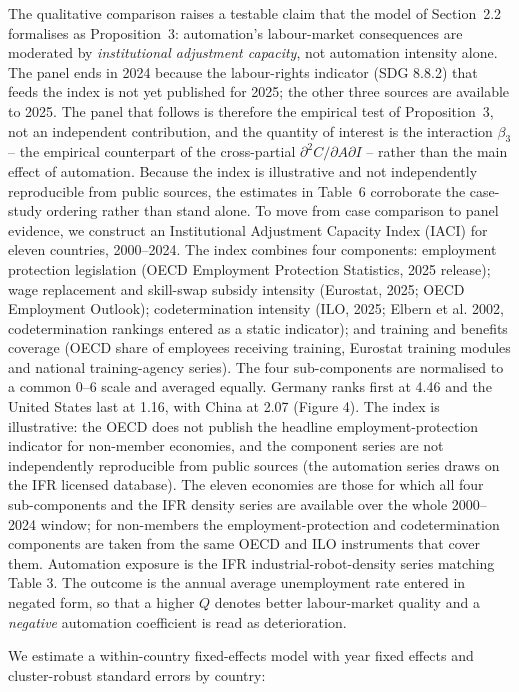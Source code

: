 \documentclass[12pt]{article}
\begin{document}
The qualitative comparison raises a testable claim that the model of Section~2.2 formalises as Proposition~3: automation's labour-market consequences are moderated by \emph{institutional adjustment capacity}, not automation intensity alone. The panel ends in 2024 because the labour-rights indicator (SDG 8.8.2) that feeds the index is not yet published for 2025; the other three sources are available to 2025. The panel that follows is therefore the empirical test of Proposition~3, not an independent contribution, and the quantity of interest is the interaction $\beta_3$ -- the empirical counterpart of the cross-partial $\partial^2 C/\partial A\partial I$ -- rather than the main effect of automation. Because the index is illustrative and not independently reproducible from public sources, the estimates in Table~6 corroborate the case-study ordering rather than stand alone. To move from case comparison to panel evidence, we construct an Institutional Adjustment Capacity Index (IACI) for eleven countries, 2000--2024. The index combines four components: employment protection legislation (OECD Employment Protection Statistics, 2025 release); wage replacement and skill-swap subsidy intensity (Eurostat, 2025; OECD Employment Outlook); codetermination intensity (ILO, 2025; Elbern et al. 2002, codetermination rankings entered as a static indicator); and training and benefits coverage (OECD share of employees receiving training, Eurostat training modules and national training-agency series). The four sub-components are normalised to a common 0--6 scale and averaged equally. Germany ranks first at 4.46 and the United States last at 1.16, with China at 2.07 (Figure 4). The index is illustrative: the OECD does not publish the headline employment-protection indicator for non-member economies, and the component series are not independently reproducible from public sources (the automation series draws on the IFR licensed database). The eleven economies are those for which all four sub-components and the IFR density series are available over the whole 2000--2024 window; for non-members the employment-protection and codetermination components are taken from the same OECD and ILO instruments that cover them. Automation exposure is the IFR industrial-robot-density series matching Table 3. The outcome is the annual average unemployment rate entered in negated form, so that a higher $Q$ denotes better labour-market quality and a \emph{negative} automation coefficient is read as deterioration.



We estimate a within-country fixed-effects model with year fixed effects and cluster-robust standard errors by country:
\end{document}
